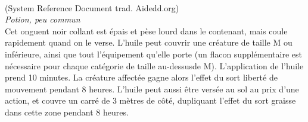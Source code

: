 \\
{\small (System Reference Document trad. Aidedd.org)}\\
{\small \it Potion, peu commun}\\
Cet onguent noir collant est épais et pèse lourd dans le contenant, mais coule rapidement quand on le verse. L'huile peut couvrir une créature de taille M ou inférieure, ainsi que tout l'équipement qu'elle porte (un flacon supplémentaire est nécessaire pour chaque catégorie de taille au-dessusde M). L'application de l'huile prend 10 minutes. La créature affectée gagne alors l'effet du sort liberté de mouvement pendant 8 heures.
L'huile peut aussi être versée au sol au prix d'une action, et couvre un carré de 3 mètres de côté, dupliquant l'effet du sort graisse dans cette zone pendant 8 heures. \\
